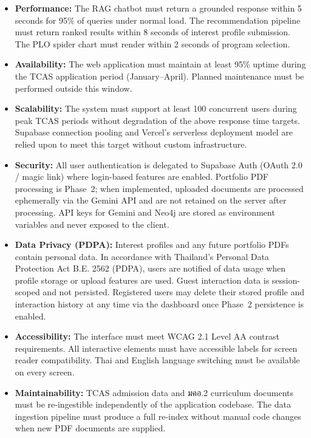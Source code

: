 \begin{itemize}[leftmargin=80pt]
    \item \textbf{Performance:} The RAG chatbot must return a grounded response within 5 seconds for 95\% of queries under normal load. The recommendation pipeline must return ranked results within 8 seconds of interest profile submission. The PLO spider chart must render within 2 seconds of program selection.

    \item \textbf{Availability:} The web application must maintain at least 95\% uptime during the TCAS application period (January--April). Planned maintenance must be performed outside this window.

    \item \textbf{Scalability:} The system must support at least 100 concurrent users during peak TCAS periods without degradation of the above response time targets. Supabase connection pooling and Vercel's serverless deployment model are relied upon to meet this target without custom infrastructure.

    \item \textbf{Security:} All user authentication is delegated to Supabase Auth (OAuth 2.0 / magic link) where login-based features are enabled. Portfolio PDF processing is Phase~2; when implemented, uploaded documents are processed ephemerally via the Gemini API and are not retained on the server after processing. API keys for Gemini and Neo4j are stored as environment variables and never exposed to the client.

    \item \textbf{Data Privacy (PDPA):} Interest profiles and any future portfolio PDFs contain personal data. In accordance with Thailand's Personal Data Protection Act B.E. 2562 (PDPA), users are notified of data usage when profile storage or upload features are used. Guest interaction data is session-scoped and not persisted. Registered users may delete their stored profile and interaction history at any time via the dashboard once Phase~2 persistence is enabled.

    \item \textbf{Accessibility:} The interface must meet WCAG 2.1 Level AA contrast requirements. All interactive elements must have accessible labels for screen reader compatibility. Thai and English language switching must be available on every screen.

    \item \textbf{Maintainability:} TCAS admission data and มคอ.2 curriculum documents must be re-ingestible independently of the application codebase. The data ingestion pipeline must produce a full re-index without manual code changes when new PDF documents are supplied.
\end{itemize}


